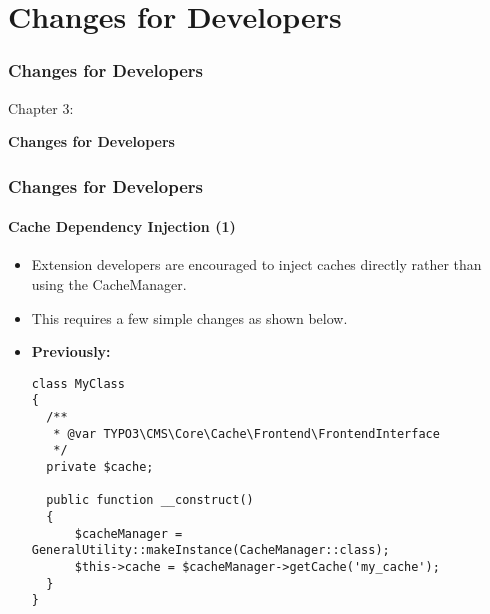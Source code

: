 %

\section{Changes for Developers}
\begin{frame}[fragile]
	\frametitle{Changes for Developers}

	\begin{center}\huge{Chapter 3:}\end{center}
	\begin{center}\huge{\color{typo3darkgrey}\textbf{Changes for Developers}}\end{center}

\end{frame}


\begin{frame}[fragile]
	\frametitle{Changes for Developers}
	\framesubtitle{Cache Dependency Injection (1)}

	\lstset{basicstyle=\tiny\ttfamily}

	\begin{itemize}
		\item Extension developers are encouraged to inject caches directly rather than using the CacheManager.
		\item This requires a few simple changes as shown below.

		\item \textbf{Previously:}

\begin{lstlisting}
class MyClass
{
  /**
   * @var TYPO3\CMS\Core\Cache\Frontend\FrontendInterface
   */
  private $cache;

  public function __construct()
  {
      $cacheManager = GeneralUtility::makeInstance(CacheManager::class);
      $this->cache = $cacheManager->getCache('my_cache');
  }
}
\end{lstlisting}

	\end{itemize}

\end{frame}

